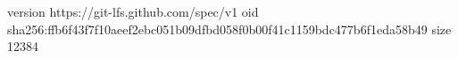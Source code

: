 version https://git-lfs.github.com/spec/v1
oid sha256:ffb6f43f7f10aeef2ebc051b09dfbd058f0b00f41c1159bdc477b6f1eda58b49
size 12384
